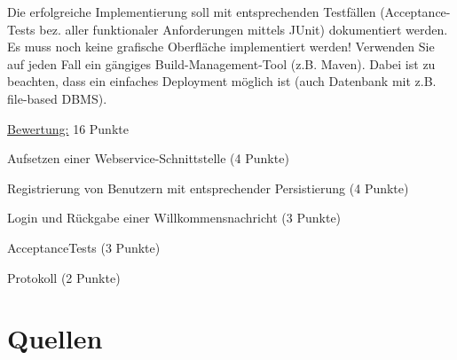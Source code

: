 Die erfolgreiche Implementierung soll mit entsprechenden Testfällen (Acceptance-Tests bez. aller funktionaler Anforderungen mittels JUnit) dokumentiert werden. Es muss noch keine grafische Oberfläche implementiert werden! Verwenden Sie auf jeden Fall ein gängiges Build-Management-Tool (z.B. Maven). Dabei ist zu beachten, dass ein einfaches Deployment möglich ist (auch Datenbank mit z.B. file-based DBMS).
\clearpage

\uline{Bewertung:} 16 Punkte
\begin{list}{-}
\item Aufsetzen einer Webservice-Schnittstelle (4 Punkte)
\item Registrierung von Benutzern mit entsprechender Persistierung (4 Punkte)
\item Login und Rückgabe einer Willkommensnachricht (3 Punkte)
\item AcceptanceTests (3 Punkte)
\item Protokoll (2 Punkte)
\end{list}

\section{Quellen}
\label{sec:Quellen}
\cite{RESTIntro} \cite{REST-JAX-RS} \cite{JavaEE} \cite{Heroku}

\clearpage
